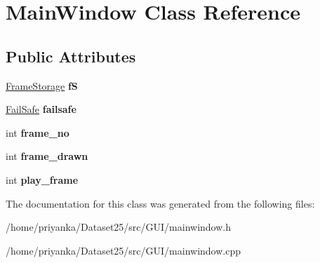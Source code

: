 \hypertarget{classMainWindow}{\section{\-Main\-Window \-Class \-Reference}
\label{classMainWindow}
}
\subsection*{\-Public \-Attributes}
\begin{DoxyCompactItemize}
\item 
\hypertarget{classMainWindow_af4e870742baec6e7da3d263501160123}{\hyperlink{classFrameStorage}{\-Frame\-Storage} {\bfseries f\-S}}\label{classMainWindow_af4e870742baec6e7da3d263501160123}

\item 
\hypertarget{classMainWindow_ac1c375e813f0acfd9bd2075f8e53b7bf}{\hyperlink{classFailSafe}{\-Fail\-Safe} {\bfseries failsafe}}\label{classMainWindow_ac1c375e813f0acfd9bd2075f8e53b7bf}

\item 
\hypertarget{classMainWindow_ac1dfe6d34127a7bfb21ff68302ac6b7b}{int {\bfseries frame\-\_\-no}}\label{classMainWindow_ac1dfe6d34127a7bfb21ff68302ac6b7b}

\item 
\hypertarget{classMainWindow_a3d02064c7363d879739b53077ddff72b}{int {\bfseries frame\-\_\-drawn}}\label{classMainWindow_a3d02064c7363d879739b53077ddff72b}

\item 
\hypertarget{classMainWindow_aa98a0ff34380a1f5f3f84f400eca4c56}{int {\bfseries play\-\_\-frame}}\label{classMainWindow_aa98a0ff34380a1f5f3f84f400eca4c56}

\end{DoxyCompactItemize}


\-The documentation for this class was generated from the following files\-:\begin{DoxyCompactItemize}
\item 
/home/priyanka/\-Dataset25/src/\-G\-U\-I/mainwindow.\-h\item 
/home/priyanka/\-Dataset25/src/\-G\-U\-I/mainwindow.\-cpp\end{DoxyCompactItemize}
